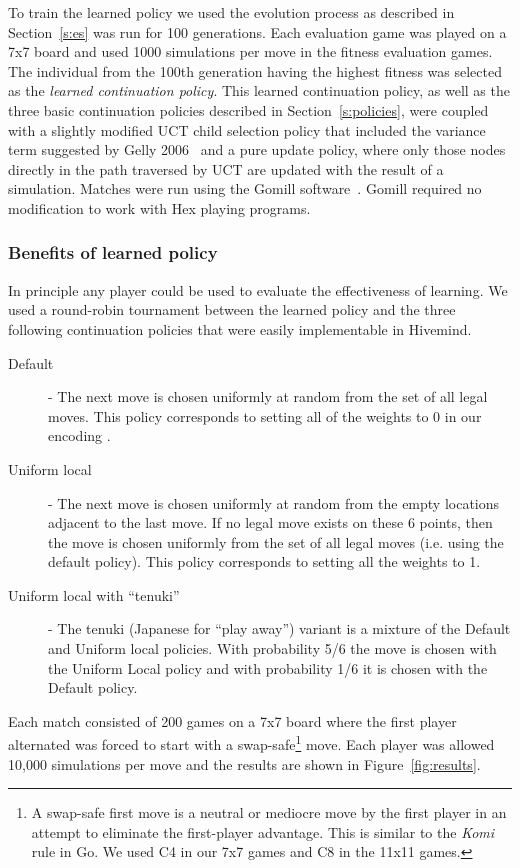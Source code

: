 \documentclass{acm_proc_article-sp}
\begin{document}
To train the learned policy we used the evolution process as described in Section~\ref{s:es} was run for 100 generations.  
Each evaluation game was played on a 7x7 board and used 1000 simulations per move in the fitness evaluation games. 
The individual from the 100th generation having the highest fitness was selected as the \emph{learned continuation policy}.
This learned continuation policy, as well as the three basic continuation policies described in Section~\ref{s:policies}, were coupled with
a slightly modified UCT child selection policy that included the variance term suggested by Gelly 2006~\cite{gelly2006exploration} and a
pure update policy, where only those nodes directly in the path traversed by UCT are updated with the result of a simulation.
Matches were run using the Gomill software~\cite{gomill}. 
Gomill required no modification to work with Hex playing programs.  

\subsubsection*{Benefits of learned policy}
In principle any player could be used to evaluate the effectiveness of learning.   
We used a round-robin tournament between the learned policy and the three following continuation policies that were easily implementable in Hivemind.

\begin{description}
	\item[Default] - The next move is chosen uniformly at random from the set of all legal moves.
	This policy corresponds to setting all of the weights to 0 in our encoding .
	\item[Uniform local] - The next move is chosen uniformly at random from the empty locations adjacent to the last move.
	If no legal move exists on these 6 points, then the move is chosen uniformly from the set of all legal moves 
	(i.e. using the default policy).  This policy corresponds to setting all the weights to 1.
	\item[Uniform local with ``tenuki''] - The tenuki (Japanese for  ``play away'') variant is a mixture of the Default and Uniform local policies.  
	With probability 5/6 the move is chosen with the Uniform Local policy and with probability 1/6 it is chosen with the Default policy. 
\end{description}

Each match consisted of 200 games on a 7x7 board where the first player alternated was forced to start with a
swap-safe\footnote{A swap-safe first move is a neutral or mediocre move by the first player in an attempt to eliminate the first-player advantage.  This is similar to the \emph{Komi} rule in Go.  We used C4 in our 7x7 games and C8 in the 11x11 games.}
move.
Each player was allowed 10,000 simulations per move and the results are shown in Figure~\ref{fig:results}.
\end{document}
